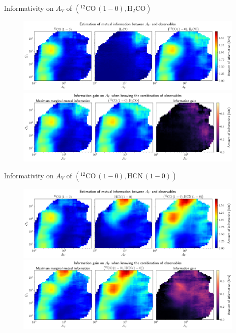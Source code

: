 \documentclass{beamer}
\begin{document}
\begin{frame}{Informativity on $A_V$ of $\left(\mathrm{^{12}CO\,(1-0)},\mathrm{H_2CO}\right)$}
    \begin{figure}
        \centering
        \includegraphics[width=0.95\linewidth]{../mi/av__12co10_h2co_mi.png}
        \vfill
        \includegraphics[width=0.95\linewidth]{../mi/av__12co10_h2co_mi_gain.png}
    \end{figure}
\end{frame}

\begin{frame}{Informativity on $A_V$ of $\left(\mathrm{^{12}CO\,(1-0)},\mathrm{HCN\,(1-0)}\right)$}
    \begin{figure}
        \centering
        \includegraphics[width=0.95\linewidth]{../mi/av__12co10_hcn10_mi.png}
        \vfill
        \includegraphics[width=0.95\linewidth]{../mi/av__12co10_hcn10_mi_gain.png}
    \end{figure}
\end{frame}
\end{document}
